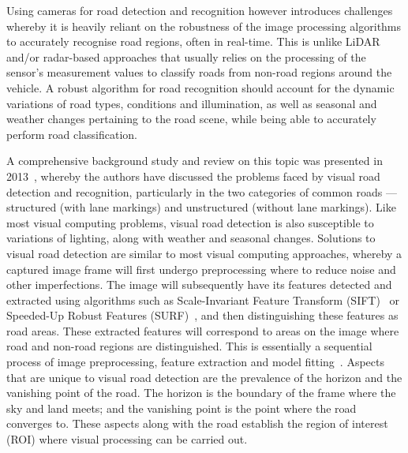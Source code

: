 Using cameras for road detection and recognition however introduces challenges whereby it is heavily reliant on the robustness of the image processing algorithms to accurately recognise road regions, often in real-time. This is unlike LiDAR and/or radar-based approaches that usually relies on the processing of the sensor's measurement values to classify roads from non-road regions around the vehicle. A robust algorithm for road recognition should account for the dynamic variations of road types, conditions and illumination, as well as seasonal and weather changes pertaining to the road scene, while being able to accurately perform road classification.  

A comprehensive background study and review on this topic was presented in 2013~\cite{sibel_yenikaya_keeping_2013}, whereby the authors have discussed the problems faced by visual road detection and recognition, particularly in the two categories of common roads --- structured (with lane markings) and unstructured (without lane markings). Like most visual computing problems, visual road detection is also susceptible to variations of lighting, along with weather and seasonal changes. Solutions to visual road detection are similar to most visual computing approaches, whereby a captured image frame will first undergo preprocessing where to reduce noise and other imperfections. The image will subsequently have its features detected and extracted using algorithms such as Scale-Invariant Feature Transform (SIFT)~\cite{lowe_distinctive_2004} or Speeded-Up Robust Features (SURF)~\cite{bay_speeded-up_2008}, and then distinguishing these features as road areas. These extracted features will correspond to areas on the image where road and non-road regions are distinguished. This is essentially a sequential process of image preprocessing, feature extraction and model fitting~\cite{bar_hillel_recent_2014}. Aspects that are unique to visual road detection are the prevalence of the horizon and the vanishing point of the road. The horizon is the boundary of the frame where the sky and land meets; and the vanishing point is the point where the road converges to. These aspects along with the road establish the region of interest (ROI) where visual processing can be carried out. 


